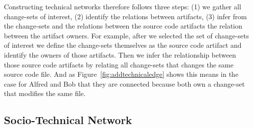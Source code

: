 Constructing technical networks therefore follows three steps: (1) we gather all change-sets of interest, (2) identify the relations between artifacts, (3) infer from the change-sets and the relations between the source code artifacts the relation between the artifact owners.
For example, after we selected the set of change-sets of interest we define the change-sets themselves as the source code artifact and identify the owners of those artifacts.
Then we infer the relationship between those source code artifacts by relating all change-sets that changes the same source code file.
And as Figure~\ref{fig:addtechnicaledge} shows this means in the case for Alfred and Bob that they are connected because both own a change-set that modifies the same file.

\subsection{Socio-Technical Network}
